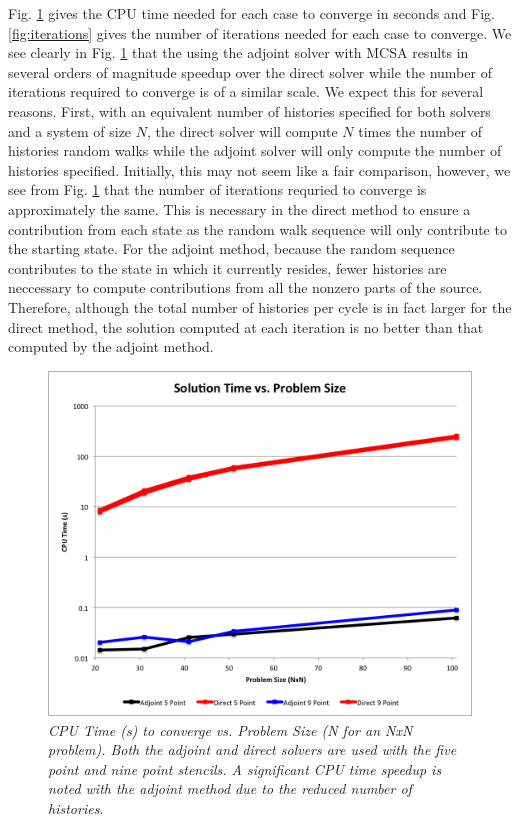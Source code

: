 \documentclass[note]{TechNote}
\begin{document}
Fig. \ref{fig:cpu_time} gives the CPU time needed for each case to
converge in seconds and Fig. \ref{fig:iterations} gives the number of
iterations needed for each case to converge. We see clearly in
Fig. \ref{fig:cpu_time} that the using the adjoint solver with MCSA
results in several orders of magnitude speedup over the direct solver
while the number of iterations required to converge is of a similar
scale. We expect this for several reasons. First, with an equivalent
number of histories specified for both solvers and a system of size
$N$, the direct solver will compute $N$ times the number of histories
random walks while the adjoint solver will only compute the number of
histories specified. Initially, this may not seem like a fair
comparison, however, we see from Fig. \ref{fig:cpu_time} that the
number of iterations requried to converge is approximately the
same. This is necessary in the direct method to ensure a contribution
from each state as the random walk sequence will only contribute to
the starting state. For the adjoint method, because the random
sequence contributes to the state in which it currently resides, fewer
histories are neccessary to compute contributions from all the nonzero
parts of the source. Therefore, although the total number of histories
per cycle is in fact larger for the direct method, the solution
computed at each iteration is no better than that computed by the
adjoint method.

\begin{figure}[htpb!]
  \centering
  \includegraphics[width=5in]{AdjointDirectCPUTime.png}
  \caption{\sl CPU Time (s) to converge vs. Problem Size (N for an NxN
    problem). Both the adjoint and direct solvers are used with the
    five point and nine point stencils. A significant CPU time speedup
    is noted with the adjoint method due to the reduced number of
    histories.}
  \label{fig:cpu_time}
\end{figure}
\end{document}
